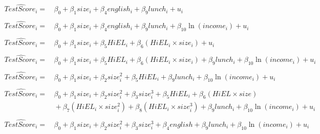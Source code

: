 \documentclass[]{book}
\theoremstyle{definition}
\theoremstyle{definition}
\theoremstyle{definition}
\theoremstyle{remark}
\begin{document}
\begin{align}
 \widehat{TestScore_i} =& \, \beta_0 + \beta_1 size_i + \beta_4 english_i + \beta_9 lunch_i + u_i \\
 \\
 \widehat{TestScore_i} =& \, \beta_0 + \beta_1 size_i + \beta_4 english_i + \beta_9 lunch_i + \beta_{10} \ln(income_i) + u_i \\
 \\
  \widehat{TestScore_i} =& \, \beta_0 + \beta_1 size_i + \beta_5 HiEL_i + \beta_6 (HiEL_i\times size_i) + u_i \\
  \\
  \widehat{TestScore_i} =& \, \beta_0 + \beta_1 size_i + \beta_5 HiEL_i + \beta_6 (HiEL_i\times size_i) + \beta_9 lunch_i + \beta_{10} \ln(income_i) + u_i \\
  \\
  \widehat{TestScore_i} =& \, \beta_0 + \beta_1 size_i + \beta_2 size_i^2 + \beta_5 HiEL_i + \beta_9 lunch_i + \beta_{10} \ln(income_i) + u_i \\
  \\
  \widehat{TestScore_i} =& \, \beta_0 + \beta_1 size_i + \beta_2 size_i^2 + \beta_3 size_i^3 + \beta_5 HiEL_i + \beta_6 (HiEL\times size) \\ &\,+ \beta_7 (HiEL_i\times size_i^2) + \beta_8 (HiEL_i\times size_i^3) + \beta_9 lunch_i + \beta_{10} \ln(income_i) + u_i \\
  \\
  \widehat{TestScore_i} =& \, \beta_0 + \beta_1 size_i + \beta_2 size_i^2 + \beta_3 size_i^3 + \beta_4 english + \beta_9 lunch_i + \beta_{10} \ln(income_i) + u_i
\end{align}
\end{document}
